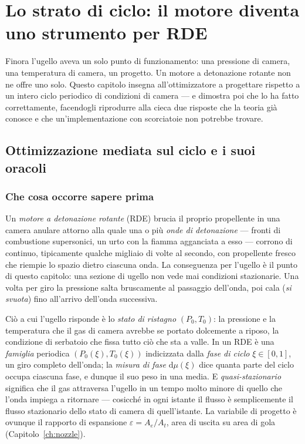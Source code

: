\chapter{Lo strato di ciclo: il motore diventa uno strumento per RDE}
\label{ch:cycle}

Finora l'ugello aveva un solo punto di funzionamento: una pressione
di camera, una temperatura di camera, un progetto. Un motore a
detonazione rotante non ne offre uno solo. Questo capitolo insegna
all'ottimizzatore a progettare rispetto a un intero ciclo periodico
di condizioni di camera --- e dimostra poi che lo ha fatto
correttamente, facendogli riprodurre alla cieca due risposte che la
teoria già conosce e che un'implementazione con scorciatoie non
potrebbe trovare.

\section{Ottimizzazione mediata sul ciclo e i suoi oracoli}

\subsection{Che cosa occorre sapere prima}

Un \emph{motore a detonazione rotante} (RDE) brucia il proprio
propellente in una camera anulare attorno alla quale una o più
\emph{onde di detonazione} --- fronti di combustione supersonici, un
urto con la fiamma agganciata a esso --- corrono di continuo, tipicamente
qualche migliaio di volte al secondo, con propellente fresco che
riempie lo spazio dietro ciascuna onda. La conseguenza per l'ugello è
il punto di questo capitolo: una sezione di ugello non vede mai
condizioni stazionarie. Una volta per giro la pressione salta
bruscamente al passaggio dell'onda, poi cala (\emph{si svuota}) fino
all'arrivo dell'onda successiva.

Ciò a cui l'ugello risponde è lo \emph{stato di ristagno}
$(P_0, T_0)$: la pressione e la temperatura che il gas di camera
avrebbe se portato dolcemente a riposo, la condizione di serbatoio
che fissa tutto ciò che sta a valle. In un RDE è una \emph{famiglia}
periodica $(P_0(\xi), T_0(\xi))$ indicizzata dalla \emph{fase di
ciclo} $\xi \in [0,1]$, un giro completo dell'onda; la \emph{misura
di fase} $\mathrm{d}\mu(\xi)$ dice quanta parte del ciclo occupa
ciascuna fase, e dunque il suo peso in una media. E
\emph{quasi-stazionario} significa che il gas attraversa l'ugello in
un tempo molto minore di quello che l'onda impiega a ritornare ---
cosicché in ogni istante il flusso è semplicemente il flusso
stazionario dello stato di camera di quell'istante. La variabile di
progetto è ovunque il rapporto di espansione
$\varepsilon = A_e/A_t$, area di uscita su area di gola
(Capitolo~\ref{ch:nozzle}).

